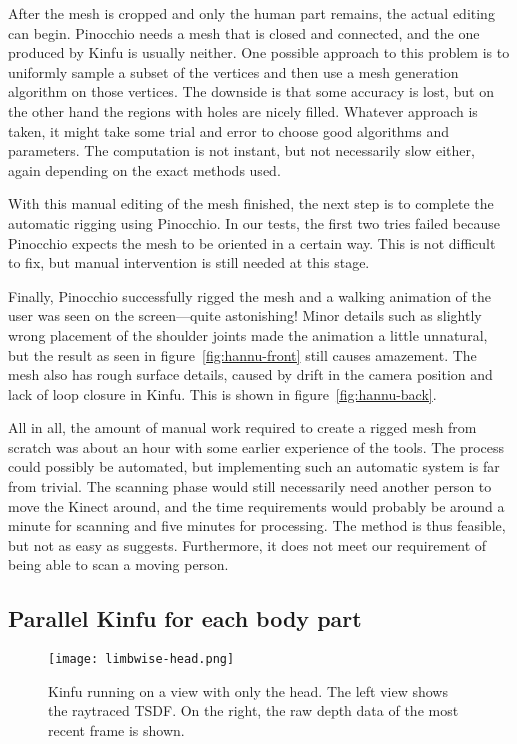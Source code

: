 After the mesh is cropped and only the human part remains, the actual editing can begin. Pinocchio needs a mesh that is closed and connected, and the one produced by Kinfu is usually neither. One possible approach to this problem is to uniformly sample a subset of the vertices and then use a mesh generation algorithm on those vertices. The downside is that some accuracy is lost, but on the other hand the regions with holes are nicely filled. Whatever approach is taken, it might take some trial and error to choose good algorithms and parameters. The computation is not instant, but not necessarily slow either, again depending on the exact methods used.

With this manual editing of the mesh finished, the next step is to complete the automatic rigging using Pinocchio. In our tests, the first two tries failed because Pinocchio expects the mesh to be oriented in a certain way. This is not difficult to fix, but manual intervention is still needed at this stage.

Finally, Pinocchio successfully rigged the mesh and a walking animation of the user was seen on the screen---quite astonishing! Minor details such as slightly wrong placement of the shoulder joints made the animation a little unnatural, but the result as seen in figure~\ref{fig:hannu-front} still causes amazement. The mesh also has rough surface details, caused by drift in the camera position and lack of loop closure in Kinfu. This is shown in figure~\ref{fig:hannu-back}.

All in all, the amount of manual work required to create a rigged mesh from scratch was about an hour with some earlier experience of the tools. The process could possibly be automated, but implementing such an automatic system is far from trivial. The scanning phase would still necessarily need another person to move the Kinect around, and the time requirements would probably be around a minute for scanning and five minutes for processing. The method is thus feasible, but not as easy as \citet{charpentier2011accurate} suggests. Furthermore, it does not meet our requirement of being able to scan a moving person.

\subsection{Parallel Kinfu for each body part} \label{approach.parallel}

\begin{figure}
    \centering
    \texttt{[image: limbwise-head.png]}
    \caption{Kinfu running on a view with only the head. The left view shows the raytraced TSDF. On the right, the raw depth data of the most recent frame is shown.}
    \label{fig:limbwise-head}
\end{figure}


